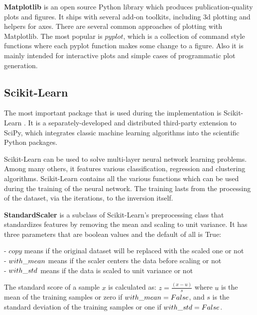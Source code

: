 \textbf{Matplotlib} is an open source Python library which produces publication-quality plots and figures. It ships with several add-on toolkits, including 3d plotting and helpers for axes. There are several common approaches of plotting with Matplotlib. The most popular is $pyplot$, which is a collection of command style functions where each pyplot function makes some change to a figure. Also it is mainly intended for interactive plots and simple cases of programmatic plot generation.


\subsection*{Scikit-Learn}

The most important package that is used during the implementation is Scikit-Learn \cite{Pedregosa2011ScikitlearnML, scikit-url}. It is a separately-developed and distributed third-party extension to SciPy, which integrates classic machine learning algorithms into the scientific Python packages. \smallskip

Scikit-Learn can be used to solve multi-layer neural network learning problems. Among many others, it features various classification, regression and clustering algorithms. Scikit-Learn contains all the various functions which can be used during the training of the neural network. The training lasts from the processing of the dataset, via the iterations, to the inversion itself. \bigskip

\newpage

\textbf{StandardScaler} is a subclass of Scikit-Learn's preprocessing class that standardizes features by removing the mean and scaling to unit variance. It has three parameters that are boolean values and the default of all is True: \smallskip

\noindent - $copy$ means if the original dataset will be replaced with the scaled one or not\\
- $with\char`_mean$ means if the scaler centers the data before scaling or not\\
- $with\char`_std$ means if the data is scaled to unit variance or not \medskip

The standard score of a sample $x$ is calculated as: $z = \frac{(x - u)}{s}$ where $u$ is the mean of the training samples or zero if $with\char`_mean=False$, and $s$ is the standard deviation of the training samples or one if $with\char`_std=False$. \medskip

